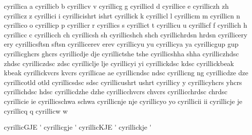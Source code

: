  cyrillica      {a}
 cyrillicb      {b}
 cyrillicv      {v}
 cyrillicg      {g}
 cyrillicd      {d}
 cyrillice      {e}
 cyrilliczh     {zh}
 cyrillicz      {z}
 cyrillici      {i}
 cyrillicishrt  {ishrt}
 cyrillick      {k}
 cyrillicl      {l}
 cyrillicm      {m}
 cyrillicn      {n}
 cyrillico      {o}
 cyrillicp      {p}
 cyrillicr      {r}
 cyrillics      {s}
 cyrillict      {t}
 cyrillicu      {u}
 cyrillicf      {f}
 cyrillich      {h}
 cyrillicc      {c}
 cyrillicch     {ch}
 cyrillicsh     {sh}
 cyrillicshch   {shch}
 cyrillichrdsn  {hrdsn}
 cyrillicery    {ery}
 cyrillicsftsn  {sftsn}
 cyrillicerev   {erev}
 cyrillicyu     {yu}
 cyrillicya     {ya}
 cyrillicgup    {gup}
 cyrillicghcrs  {ghcrs}
 cyrillicdje    {dje}
 cyrillictshe   {tshe}
 cyrillicshha   {shha}
 cyrilliczhdsc  {zhdsc}
 cyrilliczdsc   {zdsc}
 cyrilliclje    {lje}
 cyrillicyi     {yi}
 cyrillickdsc   {kdsc}
 cyrillickbeak  {kbeak}
 cyrillickvcrs  {kvcrs}
 cyrillicae     {ae}
 cyrillicndsc   {ndsc}
 cyrillicng     {ng}
 cyrillicdze    {dze}
 cyrillicotld   {otld}
 cyrillicsdsc   {sdsc}
 cyrillicushrt  {ushrt}
 cyrillicy      {y}
 cyrillicyhcrs  {yhcrs}
 cyrillichdsc   {hdsc}
 cyrillicdzhe   {dzhe}
 cyrillicchvcrs {chvcrs}
 cyrillicchrdsc {chrdsc}
 cyrillicie     {ie}
 cyrillicschwa  {schwa}
 cyrillicnje    {nje}
 cyrillicyo     {yo}
 cyrillicii     {ii}
 cyrillicje     {je}
 cyrillicq      {q}
 cyrillicw      {w}

 cyrillicGJE      {\'\cyrillicG}
 cyrillicgje      {\'\cyrillicg}
 cyrillicKJE      {\'\cyrillicK}
 cyrillickje      {\'\cyrillick}

